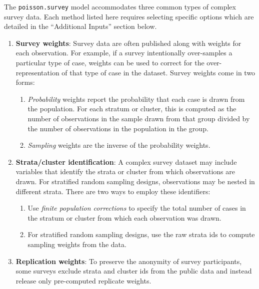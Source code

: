 The {\tt poisson.survey} model accommodates three common types of 
complex survey data.  Each method listed here requires selecting 
specific options which are detailed in the ``Additional Inputs'' 
section below.  \begin{enumerate}

\item \textbf{Survey weights}:  Survey data are often published along
with weights for each observation.  For example, if a survey
intentionally over-samples a particular type of case, weights can be
used to correct for the over-representation of that type of case in
the dataset. Survey weights come in two forms:
\begin{enumerate}

\item \textit{Probability} weights report the probability that each
case is drawn from the population.  For each stratum or cluster, 
this is computed as the number of observations in the sample drawn 
from that group divided by the number of observations in the 
population in the group.

\item \textit{Sampling} weights are the inverse of the probability
weights.   

\end{enumerate}

\item \textbf{Strata/cluster identification}:  A complex survey 
dataset may include variables that identify the strata or cluster 
from which observations are drawn.  For stratified random sampling 
designs, observations may be nested in different strata.  There are 
two ways to employ these identifiers:

\begin{enumerate}

\item Use \textit{finite population corrections} to specify the
total number of cases in the stratum or cluster from which each
observation was drawn.

\item For stratified random sampling designs, use the raw strata ids
to compute sampling weights from the data.

\end{enumerate}

\item \textbf{Replication weights}: To preserve the anonymity of
survey participants, some surveys exclude strata and cluster ids 
from the public data and instead release only pre-computed replicate 
weights.

\end{enumerate}

